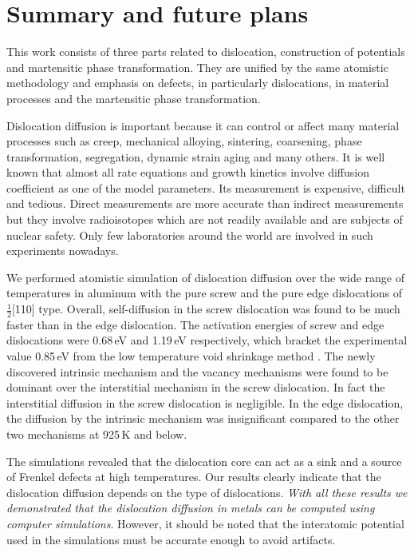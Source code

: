 \chapter{Summary and future plans}
This work consists of three parts related to dislocation, construction of potentials and martensitic phase transformation. They are unified by the same atomistic methodology and emphasis on defects, in particularly dislocations, in material processes and the martensitic phase transformation.

Dislocation diffusion is important because it can control or affect many material processes such as creep, mechanical alloying, sintering, coarsening, phase transformation, segregation, dynamic strain aging and many others. It is well known that almost all rate equations and growth kinetics involve diffusion coefficient as one of the model parameters. Its measurement is expensive, difficult and tedious. Direct measurements are more accurate than indirect measurements but they involve radioisotopes which are not readily available and are subjects of nuclear safety. Only few laboratories around the world are involved in such experiments nowadays.
 
We performed atomistic simulation of dislocation diffusion over the wide range of temperatures in aluminum with the pure screw and the pure edge dislocations of $\frac{1}{2}$[110] type. Overall, self-diffusion in the screw dislocation was found to be much faster than in the edge dislocation. The activation energies of screw and edge dislocations were 0.68\,eV and 1.19\,eV respectively, which bracket the experimental value 0.85\,eV from the low temperature void shrinkage method \cite{Volin71}. The newly discovered intrinsic mechanism and the vacancy mechanisms were found to be dominant over the interstitial mechanism in the screw dislocation. In fact the interstitial diffusion in the screw dislocation is negligible. In the edge dislocation, the diffusion by the intrinsic mechanism was insignificant compared to the other two mechanisms at 925\,K and below. 

The simulations revealed that the dislocation core can act as a sink and a source of Frenkel defects at high temperatures. Our results clearly indicate that the dislocation diffusion depends on the type of dislocations. \emph{With all these results we demonstrated that the dislocation diffusion in metals can be computed using computer simulations}. However, it should be noted that the interatomic potential used in the simulations must be accurate enough to avoid artifacts.


